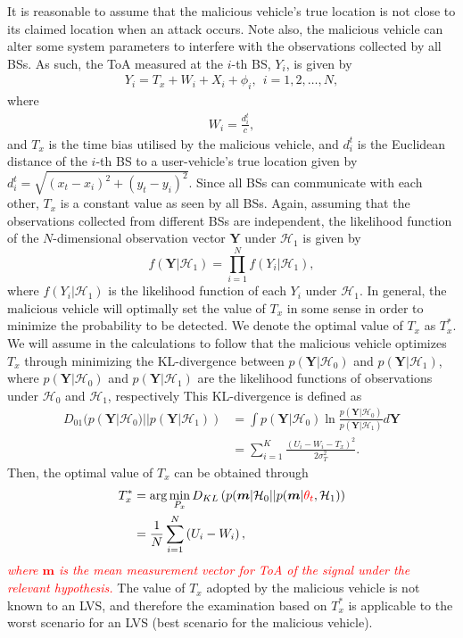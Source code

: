 \documentclass[journal]{IEEEtran}
\newcommand{\Hnull}{\mathcal{H}_0}
\newcommand{\Halt}{\mathcal{H}_1}
\begin{document}
It is reasonable to assume that the malicious vehicle's true location is not close to its claimed location when an attack occurs.   Note also,  the malicious vehicle can alter some system parameters to interfere  with the observations collected by all BSs. As such, the ToA measured at the $i$-th BS, $Y_i$, is given by
\begin{eqnarray}\label{observ_H1}
Y_i = T_x + W_i + X_i + \phi_i, ~~i = 1, 2, \dots, N,
\end{eqnarray}
where
\begin{eqnarray}
W_i = \frac{d_i^t}{c},
\end{eqnarray}
and $T_x$ is the time bias utilised by the malicious vehicle, and $d_i^t$ is the Euclidean distance of the $i$-th BS to a user-vehicle's true location given by $d_i^t = \sqrt{(x_t - x_i)^2 + (y_t - y_i)^2}$. Since all BSs can communicate with each other,  $T_x$ is a constant value as seen by all BSs. Again, assuming that the observations collected from different BSs are independent, the likelihood function of the $N$-dimensional observation vector $\mathbf{Y}$ under $\Halt$ is given by
\begin{equation}\label{likelihood_H1}
f\left(\mathbf{Y}|\Halt\right) = \prod_{i=1}^N f\left(Y_i|\Halt\right),
\end{equation}
where $f\left(Y_i|\Halt\right)$ is the likelihood function of each $Y_i$ under $\Halt$. In general, the malicious vehicle will optimally set the value of $T_x$ in some sense in order to minimize the probability to be detected. We denote the optimal value of $T_x$ as $T_x^{\ast}$.
We will assume in the calculations to follow that the malicious vehicle optimizes $T_x$ through minimizing the KL-divergence between $p(\mathbf{Y}|\Hnull)$ and $p(\mathbf{Y}|\Halt)$, where $p(\mathbf{Y}|\Hnull)$ and $p(\mathbf{Y}|\Halt)$ are the likelihood functions of observations under $\Hnull$ and $\Halt$, respectively This KL-divergence is defined as
\begin{equation}\label{KLdistance}
\begin{split}
D_{01}(p(\mathbf{Y}|\Hnull)|| p(\mathbf{Y}|\Halt)) &= \int p(\mathbf{Y}|\Hnull) \ln {\frac{p(\mathbf{Y}|\Hnull)}{p(\mathbf{Y}|\Halt)}} d{\mathbf{Y}}\\
&= \sum_{i=1}^{K} \frac{\left(U_i - W_i - T_x \right)^2}{2\sigma_{T}^2}.
\end{split}
\end{equation}
Then, the optimal value of $T_x$ can be obtained through
\begin{equation}\label{optimal Px}
\begin{split}
T_x^{\ast} &= \arg\underset{P_x}{\min}\,{D_{KL}\left(p(\bm{m}|\Hnull|| p(\bm{m}|\textcolor{red}{\theta_t}, \Halt)\right)}\\
&= \frac{1}{N}\sum_{i=1}^{N} \left(U_i - W_i\right),
\end{split}
\end{equation}
\textcolor{red}{\textit{where $\bm{m}$ is the mean measurement vector for ToA of the signal under the relevant hypothesis.}} The value of $T_x$ adopted by the malicious vehicle is not known to an LVS, and therefore the examination based on $T_x^{\ast}$ is applicable to the worst scenario for an LVS (best scenario for the malicious vehicle).
\end{document}
